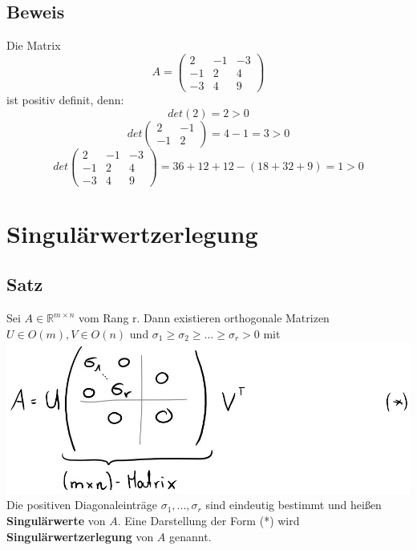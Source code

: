 \documentclass{scrbook}
\begin{document}
\section{Beweis}
Die Matrix
\[A = \left(
\begin{array}{ccc}
2&-1&-3\\
-1&2&4\\
-3&4&9
\end{array}
\right)\] ist positiv definit, denn:
\[det(2) = 2 >0\]
\[det\left(
\begin{array}{cc}
2&-1\\
-1&2
\end{array}
\right) = 4-1=3>0\]
\[det\left(
\begin{array}{ccc}
2&-1&-3\\
-1&2&4\\
-3&4&9
\end{array}\right)
=36+12+12-(18+32+9) =1>0
\]
\chapter{Singulärwertzerlegung}
\section{Satz}
Sei $A \in \mathbb{R}^{m \times n}$ vom Rang r. Dann existieren orthogonale Matrizen $U \in O(m) , V \in O(n)$ und $\sigma_1 \geq \sigma_2 \geq ... \geq \sigma_r > 0$ mit\\
\includegraphics{Satz_14_1_1.jpeg}\\
Die positiven Diagonaleinträge $\sigma_1,...,\sigma_r$ sind eindeutig bestimmt und heißen \textbf{Singulärwerte} von $A$. Eine Darstellung der Form (*) wird \textbf{Singulärwertzerlegung} von $A$ genannt.
\end{document}
